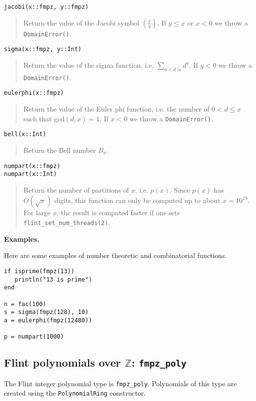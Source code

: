 \documentclass[a4paper,10pt]{article}
\newcommand{\Z}{\mathbb{Z}}
\newcommand{\code}{\lstinline}
\newcommand{\desc}[1]{\vspace{-3mm}\begin{quote}#1\end{quote}}
\newcommand{\ljk}[2]{\left(\frac{#1}{#2}\right)}
\begin{document}
{{\begin{lstlisting}
jacobi(x::fmpz, y::fmpz)
\end{lstlisting}

\desc{Return the value of the Jacobi symbol $\ljk{x}{y}$. If $y \leq x$ or $x < 0$ we
throw a \code{DomainError()}.}

\begin{lstlisting}
sigma(x::fmpz, y::Int)
\end{lstlisting}

\desc{Return the value of the sigma function, i.e. $\sum_{0 < d \;| x} d^y$. If $y < 0$
we throw a \code{DomainError()}.}

\begin{lstlisting}
eulerphi(x::fmpz)
\end{lstlisting}

\desc{Return the value of the Euler phi function, i.e. the number of $0 < d \leq x$ such
that gcd$(d, x) = 1$. If $x < 0$ we throw a \code{DomainError()}.}

\begin{lstlisting}
bell(x::Int)
\end{lstlisting}

\desc{Return the Bell number $B_n$.}

\begin{lstlisting}
numpart(x::fmpz)
numpart(x::Int)
\end{lstlisting}

\desc{Return the number of partitions of $x$, i.e. $p(x)$. Since $p(x)$
has $O(\sqrt{x})$ digits, this function can only be computed up to
about $x = 10^{19}$. For large $x$, the result is computed faster if one
sets \code{flint_set_num_threads(2)}.}

\textbf{Examples.}

Here are some examples of number theoretic and combinatorial functions.

\begin{lstlisting}
if isprime(fmpz(13))
   println("13 is prime")
end

n = fac(100)
s = sigma(fmpz(128), 10)
a = eulerphi(fmpz(12480))

p = numpart(1000)
\end{lstlisting}

\subsection{Flint polynomials over $\Z$: \code{fmpz_poly}}

The Flint integer polynomial type is \code{fmpz_poly}. Polynomials of this type are created
using the \code{PolynomialRing} constructor.

}}
\end{document}
